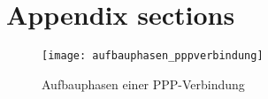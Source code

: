 \section{Appendix sections}

 \begin{figure}[htp]
  \begin{center}
   \texttt{[image: aufbauphasen\_pppverbindung]}
  \end{center}
  \caption{Aufbauphasen einer PPP-Verbindung}\cite{zackercomptia}
  \label{abb:aufbauphasen_pppverbindung}
 \end{figure}
